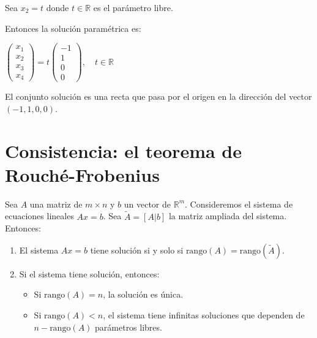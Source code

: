 \begin{example}
\begin{myproof}
Sea $x_2 = t$ donde $t \in \mathbb{R}$ es el parámetro libre. 

Entonces la solución paramétrica es:

$\boxed{\begin{pmatrix}
x_1 \\ x_2 \\ x_3 \\ x_4
\end{pmatrix} = t\begin{pmatrix}
-1 \\ 1 \\ 0 \\ 0
\end{pmatrix}, \quad t \in \mathbb{R}}$

El conjunto solución es una recta que pasa por el origen en la dirección del vector $(-1, 1, 0, 0)$.
\end{myproof}
\end{example}

\section{Consistencia: el teorema de Rouché-Frobenius}

\begin{theorem}
Sea $A$ una matriz de $m \times n$ y $b$ un vector de $\mathbb{R}^m$. Consideremos el sistema de ecuaciones lineales $Ax = b$. Sea $\tilde{A} = [A|b]$ la matriz ampliada del sistema. Entonces:
\begin{enumerate}
    \item El sistema $Ax = b$ tiene solución si y solo si $\text{rango}(A) = \text{rango}(\tilde{A})$.
    \item Si el sistema tiene solución, entonces:
    \begin{itemize}
        \item Si $\text{rango}(A) = n$, la solución es única.
        \item Si $\text{rango}(A) < n$, el sistema tiene infinitas soluciones que dependen de $n - \text{rango}(A)$ parámetros libres.
    \end{itemize}
\end{enumerate}
\end{theorem}

